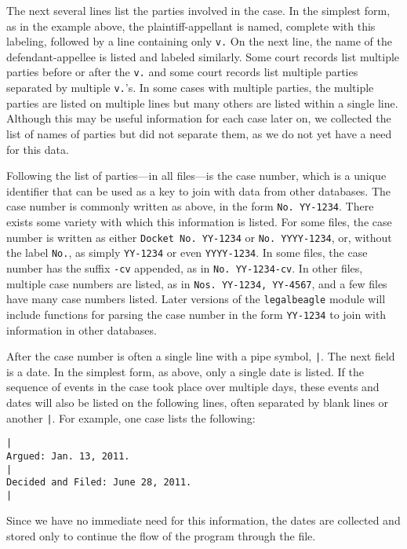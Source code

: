 \documentclass[11pt]{paper}
\begin{document}
The next several lines list the parties involved in the case. 
In the simplest form, as in the example above, 
the plaintiff-appellant is named, complete with this labeling, 
followed by a line containing only \texttt{v.}
On the next line, the name of the defendant-appellee is listed and labeled similarly. 
Some court records list multiple parties before or after the \texttt{v.} and 
some court records list multiple parties separated by multiple \texttt{v.}'s. 
In some cases with multiple parties, the multiple parties are listed on
multiple lines but many others are listed within a single line. 
Although this may be useful information for each case later on, 
we collected the list of names of parties but did not separate them, 
as we do not yet have a need for this data.

Following the list of parties---in all files---is the case number, 
which is a unique identifier that can be used as a key to join with data from other databases. 
The case number is commonly written as above, in the form \texttt{No. YY-1234}. 
There exists some variety with which this information is listed. 
For some files, the case number is written as either \texttt{Docket No. YY-1234}
or \texttt{No. YYYY-1234}, or, without the label \texttt{No.}, as simply \texttt{YY-1234} or even \texttt{YYYY-1234}. 
In some files, the case number has the suffix \texttt{-cv} appended, as in \texttt{No. YY-1234-cv}. 
In other files, multiple case numbers are listed, as in \texttt{Nos. YY-1234, YY-4567}, and a few files have many case numbers listed. 
Later versions of the \texttt{legalbeagle} module will include functions for parsing the case number in the form \texttt{YY-1234}
to join with information in other databases.

After the case number is often a single line with a pipe symbol, \texttt{|}. 
The next field is a date. In the simplest form, as above, only a single date is listed. 
If the sequence of events in the case took place over multiple days, 
these events and dates will also be listed on the following lines, 
often separated by blank lines or another \texttt{|}. 
For example, one case lists the following:
% 
\begin{verbatim}
|
Argued: Jan. 13, 2011.
|
Decided and Filed: June 28, 2011.
|
\end{verbatim}
% 
Since we have no immediate need for this information, 
the dates are collected and stored only to continue the flow of the program through the file. 
\end{document}
